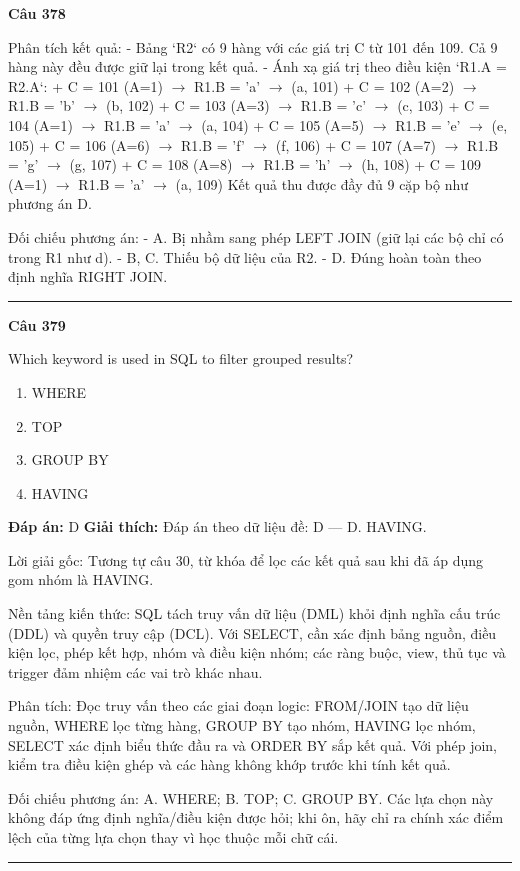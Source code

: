 \documentclass[11pt,a4paper]{article}
\newenvironment{question}[1]{%
  \par\vspace{1em}\noindent\textbf{\large Câu #1}\par\vspace{0.4em}
}{%
  \par\vspace{1em}\hrule\vspace{0.6em}
}
\newenvironment{choices}{%
  \begin{enumerate}[label=\textbf{\Alph*.},leftmargin=2.2em,itemsep=2pt,topsep=3pt]
}{%
  \end{enumerate}
}
\newcommand{\choice}{\item}
\begin{document}
\begin{question}{378}
Phân tích kết quả:
- Bảng `R2` có 9 hàng với các giá trị C từ 101 đến 109. Cả 9 hàng này đều được giữ lại trong kết quả.
- Ánh xạ giá trị theo điều kiện `R1.A = R2.A`:
  + C = 101 (A=1) $\rightarrow$ R1.B = 'a' $\rightarrow$ (a, 101)
  + C = 102 (A=2) $\rightarrow$ R1.B = 'b' $\rightarrow$ (b, 102)
  + C = 103 (A=3) $\rightarrow$ R1.B = 'c' $\rightarrow$ (c, 103)
  + C = 104 (A=1) $\rightarrow$ R1.B = 'a' $\rightarrow$ (a, 104)
  + C = 105 (A=5) $\rightarrow$ R1.B = 'e' $\rightarrow$ (e, 105)
  + C = 106 (A=6) $\rightarrow$ R1.B = 'f' $\rightarrow$ (f, 106)
  + C = 107 (A=7) $\rightarrow$ R1.B = 'g' $\rightarrow$ (g, 107)
  + C = 108 (A=8) $\rightarrow$ R1.B = 'h' $\rightarrow$ (h, 108)
  + C = 109 (A=1) $\rightarrow$ R1.B = 'a' $\rightarrow$ (a, 109)
Kết quả thu được đầy đủ 9 cặp bộ như phương án D.

Đối chiếu phương án:
- A. Bị nhầm sang phép LEFT JOIN (giữ lại các bộ chỉ có trong R1 như d).
- B, C. Thiếu bộ dữ liệu của R2.
- D. Đúng hoàn toàn theo định nghĩa RIGHT JOIN.
\end{question}

\begin{question}{379}
Which keyword is used in SQL to filter grouped results?
\begin{choices}
\choice WHERE
\choice TOP
\choice GROUP BY
\choice HAVING
\end{choices}
\textbf{Đáp án:} D
\textbf{Giải thích:} Đáp án theo dữ liệu đề: D — D. HAVING.

Lời giải gốc: Tương tự câu 30, từ khóa để lọc các kết quả sau khi đã áp dụng gom nhóm là HAVING.

Nền tảng kiến thức: SQL tách truy vấn dữ liệu (DML) khỏi định nghĩa cấu trúc (DDL) và quyền truy cập (DCL). Với SELECT, cần xác định bảng nguồn, điều kiện lọc, phép kết hợp, nhóm và điều kiện nhóm; các ràng buộc, view, thủ tục và trigger đảm nhiệm các vai trò khác nhau.

Phân tích: Đọc truy vấn theo các giai đoạn logic: FROM/JOIN tạo dữ liệu nguồn, WHERE lọc từng hàng, GROUP BY tạo nhóm, HAVING lọc nhóm, SELECT xác định biểu thức đầu ra và ORDER BY sắp kết quả. Với phép join, kiểm tra điều kiện ghép và các hàng không khớp trước khi tính kết quả.

Đối chiếu phương án: A. WHERE; B. TOP; C. GROUP BY. Các lựa chọn này không đáp ứng định nghĩa/điều kiện được hỏi; khi ôn, hãy chỉ ra chính xác điểm lệch của từng lựa chọn thay vì học thuộc mỗi chữ cái.
\end{question}
\end{document}
